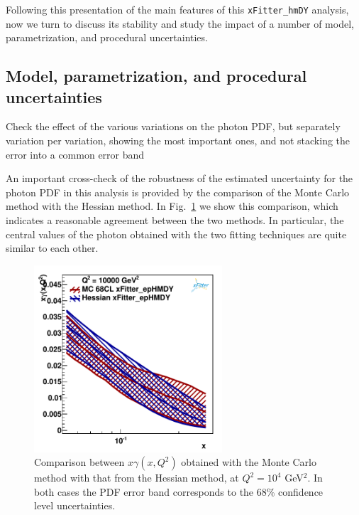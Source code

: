 Following this presentation of the main features of this
{\tt xFitter\_hmDY} analysis, now we turn to discuss its stability
and study the impact of a number of model, parametrization,
and procedural uncertainties.

\subsection{Model, parametrization, and procedural uncertainties}

Check the effect of the various variations on the photon PDF, but separately variation per variation,
showing the most important ones, and not stacking the error into a common error band

An important cross-check of the robustness of the estimated uncertainty for the photon
PDF in this analysis is provided by the comparison of the Monte Carlo method
with the Hessian method.
%
In Fig.~\ref{fig:photon_mc_vs_hessian} we show this comparison,
which indicates a reasonable agreement between the two methods.
%
In particular, the central values of the photon obtained with the two fitting
techniques are quite similar to each other.

\begin{figure}[h]
\centering
\includegraphics[width=7cm]{figs/photon_mc_vs_hessian} 
\caption{Comparison between $x\gamma(x,Q^2)$ obtained with the
  Monte Carlo method with that from the Hessian method,
  at $Q^2=10^4$ GeV$^2$.
  In both cases the PDF error band corresponds to the 68\% confidence level
  uncertainties.}
\label{fig:photon_mc_vs_hessian}
\end{figure}


